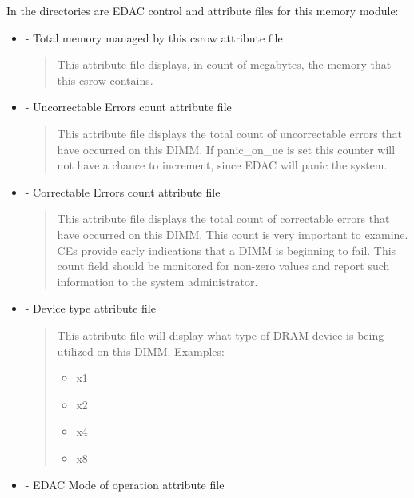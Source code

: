 \documentclass[a4paper,8pt,english]{sphinxmanual}
\begin{document}
In the  directories are EDAC control and attribute files for
this  memory module:
\begin{itemize}
\item {} 
 - Total memory managed by this csrow attribute file
\begin{quote}

This attribute file displays, in count of megabytes, the memory
that this csrow contains.
\end{quote}

\item {} 
 - Uncorrectable Errors count attribute file
\begin{quote}

This attribute file displays the total count of uncorrectable
errors that have occurred on this DIMM. If panic\_on\_ue is set
this counter will not have a chance to increment, since EDAC
will panic the system.
\end{quote}

\item {} 
 - Correctable Errors count attribute file
\begin{quote}

This attribute file displays the total count of correctable
errors that have occurred on this DIMM. This count is very
important to examine. CEs provide early indications that a
DIMM is beginning to fail. This count field should be
monitored for non-zero values and report such information
to the system administrator.
\end{quote}

\item {} 
  - Device type attribute file
\begin{quote}

This attribute file will display what type of DRAM device is
being utilized on this DIMM.
Examples:
\begin{itemize}
\item {} 
x1

\item {} 
x2

\item {} 
x4

\item {} 
x8

\end{itemize}
\end{quote}

\item {} 
 - EDAC Mode of operation attribute file
\begin{quote}


\end{quote}
\end{itemize}
\end{document}
